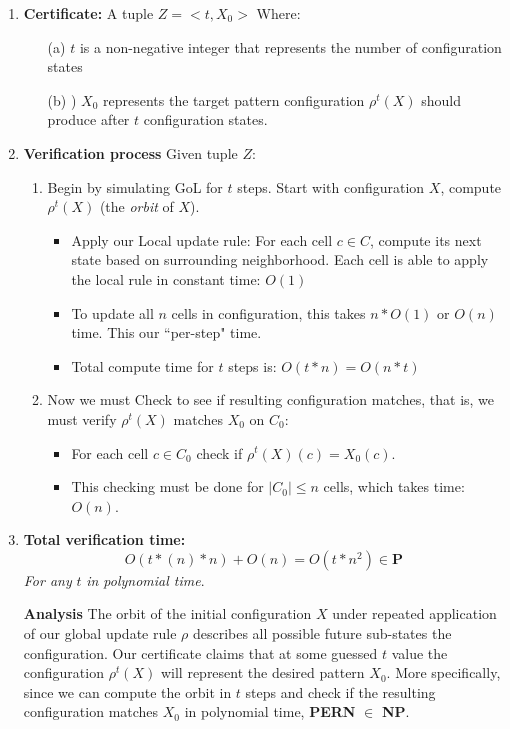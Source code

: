 \documentclass{article}
\theoremstyle{definition}
\theoremstyle{plain}
\theoremstyle{plain}
\begin{document}
\begin{enumerate}
    \item \textbf{Certificate:} A tuple $Z = <t, X_0 >$
      Where: 
      \begin{enumerate}
          \item[(a)] $t$ is a non-negative integer that represents the number of configuration states 
          \item[(b)]) $X_0$ represents the target pattern configuration $\rho^t(X)$ should produce after $t$ configuration states.
      \end{enumerate}
    \item \textbf{Verification process} Given tuple $Z$:
    \begin{enumerate}
        \item Begin by simulating GoL for $t$ steps. Start with configuration $X$, compute $\rho^t(X)$ (the \textit{orbit} of $X$).
        \begin{itemize}
            \item Apply our Local update rule: For each cell $c \in C$, compute its next state based on surrounding neighborhood. Each cell is able to apply the local rule in constant time: $O(1)$
            \item To update all $n$ cells in configuration, this takes $n*O(1)$ or $O(n)$ time. This our ``per-step" time.
            \item Total compute time for $t$ steps is: $O(t * n) = O(n * t)$
        \end{itemize}
        \item Now we must Check to see if resulting configuration matches, that is, we must verify $\rho^t(X)$  matches $X_0$ on $C_0$:
        \begin{itemize}
            \item For each cell $c \in C_0$ check if $\rho^t(X)(c) = X_0(c)$.
            \item This checking must be done for $ |C_0| \leq n $ cells, which takes time: $ O(n) $.
        \end{itemize}
    \end{enumerate}

    \item \textbf{Total verification time: }
      \begin{equation}
        O(t*(n)*n)+O(n)= O(t *n^2) \in \textbf{P} 
    \end{equation}
    \textit{For any} $t$ \textit{in polynomial time}.
  \item[]\textbf{Analysis}
    The orbit of the initial configuration $X$ under repeated application of our global update rule $\rho$ describes all possible future sub-states the configuration. Our certificate claims that at some guessed $t$ value the configuration $\rho^t(X)$ will represent the desired pattern $X_0$. More specifically, since we can compute the orbit in $t$ steps and check if the resulting configuration matches $X_0$ in polynomial time, \textbf{PERN} $\in$ \textbf{NP}.
\end{enumerate}
\end{document}
